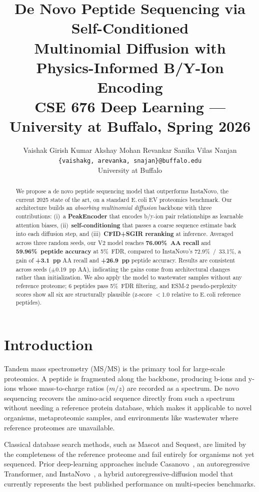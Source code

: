 \documentclass[10pt,twocolumn]{article}
\title{%
  \vspace{-0.5in}
  \textbf{De Novo Peptide Sequencing via Self-Conditioned\\
  Multinomial Diffusion with Physics-Informed B/Y-Ion Encoding}\\[4pt]
  \normalsize CSE 676 Deep Learning --- University at Buffalo, Spring 2026
}
\author{%
  Vaishak Girish Kumar \quad Akshay Mohan Revankar \quad Sanika Vilas Nanjan \\
  \texttt{\{vaishakg, arevanka, snajan\}@buffalo.edu} \\
  University at Buffalo
}
\date{}
\begin{document}
\maketitle
\thispagestyle{fancy}

\begin{abstract}
\noindent
We propose a de novo peptide sequencing model that outperforms InstaNovo, the current 2025 state of the art, on a standard E.\,coli EV proteomics benchmark.
Our architecture builds an \textit{absorbing multinomial diffusion} backbone with three contributions: (i)~a \textbf{PeakEncoder} that encodes b/y-ion pair relationships as learnable attention biases,
(ii)~\textbf{self-conditioning} that passes a coarse sequence estimate back into each diffusion step,
and (iii)~\textbf{CFID+SGIR reranking} at inference.
Averaged across three random seeds, our V2 model reaches
\textbf{76.00\%~AA recall} and \textbf{59.96\%~peptide accuracy} at 5\%~FDR,
compared to InstaNovo's 72.9\%~/~33.1\%,
a gain of \textbf{+3.1~pp} AA recall and \textbf{+26.9~pp} peptide accuracy.
Results are consistent across seeds ($\pm$0.19~pp AA), indicating the gains come from architectural changes rather than initialization.
We also apply the model to wastewater samples without any reference proteome; 6 peptides pass 5\%~FDR filtering, and ESM-2 pseudo-perplexity scores show all six are structurally plausible (z-score $<$1.0 relative to E.\,coli reference peptides).
\end{abstract}

\section{Introduction}

Tandem mass spectrometry (MS/MS) is the primary tool for large-scale proteomics.
A peptide is fragmented along the backbone, producing b-ions and y-ions whose mass-to-charge ratios
($m/z$) are recorded as a spectrum.
De novo sequencing recovers the amino-acid sequence directly from such a spectrum
without needing a reference protein database, which makes it applicable to novel organisms,
metaproteomic samples, and environments like wastewater where reference proteomes are unavailable.

Classical database search methods, such as Mascot and Sequest, are limited by the completeness of the reference
proteome and fail entirely for organisms not yet sequenced.
Prior deep-learning approaches include Casanovo~\citep{casanovo2023}, an autoregressive Transformer,
and InstaNovo~\citep{instanovo2024}, a hybrid autoregressive-diffusion model that currently represents
the best published performance on multi-species benchmarks.
\end{document}
